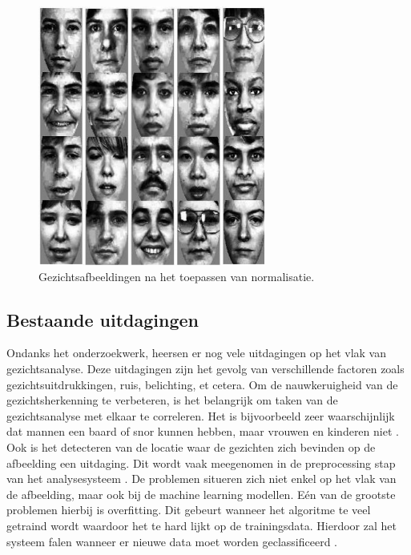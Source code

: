 \begin{figure}
    \centering
    \includegraphics[width=\columnwidth]{graphics/afternorm.PNG}
    \caption{\label{fig:afternormalisation}Gezichtsafbeeldingen na het toepassen van normalisatie\autocite{Chen2011}.}
\end{figure}  

\subsection{Bestaande uitdagingen}
Ondanks het onderzoekwerk, heersen er nog vele uitdagingen op het vlak van gezichtsanalyse. Deze uitdagingen zijn het gevolg van verschillende factoren zoals gezichtsuitdrukkingen, ruis, belichting, et cetera. Om de nauwkeruigheid van de gezichtsherkenning te verbeteren, is het belangrijk om taken van de gezichtsanalyse met elkaar te correleren. Het is bijvoorbeeld zeer waarschijnlijk dat mannen een baard of snor kunnen hebben, maar vrouwen en kinderen niet \autocite{Siddiqi2022}.  Ook is het detecteren van de locatie waar de gezichten zich bevinden op de afbeelding een uitdaging. Dit wordt vaak meegenomen in de preprocessing stap van het analysesysteem \autocite{Jiang2008}. 
De problemen situeren zich niet enkel op het vlak van de afbeelding, maar ook bij de machine learning modellen. Eén van de grootste problemen hierbij is overfitting. Dit gebeurt wanneer het algoritme te veel getraind wordt waardoor het te hard lijkt op de trainingsdata. Hierdoor zal het systeem falen wanneer er nieuwe data moet worden geclassificeerd \autocite{Coppens2018}.

